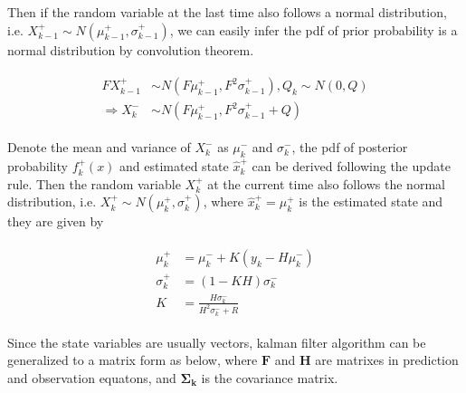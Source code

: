 \documentclass[conference]{IEEEtran}
\begin{document}
	Then if the random variable at the last time also follows a normal distribution, i.e. $X_{k-1}^{+}\sim N(\mu _{k-1}^{+},\sigma  _{k-1}^{+})$, we can easily infer the pdf of prior probability is a normal distribution by convolution theorem.
	
	\begin{equation}
	\begin{split}
	\begin{aligned}
	FX_{k-1}^{+}&\sim N(F\mu _{k-1}^{+},F^{2}\sigma  _{k-1}^{+}), Q_{k}\sim N(0,Q)\\
	\Rightarrow X_{k}^{-}&\sim N(F\mu _{k-1}^{+},F^{2}\sigma  _{k-1}^{+}+Q)
	\label{eq10}
	\end{aligned}
	\end{split}
	\end{equation}
	
	Denote the mean and variance of $X_{k}^{-}$ as $\mu_{k}^{-}$ and $\sigma_{k}^{-}$, the pdf of posterior probability $f_{k}^{+}(x)$ and estimated state $\hat{x}_{k}^{+}$ can be derived following the update rule. Then the random variable $X_{k}^{+}$ at the current time also follows the normal distribution, i.e. $X_{k}^{+} \sim N(\mu_{k}^{+}, \sigma_{k}^{+})$, where $\hat{x}_{k}^{+}=\mu_{k}^{+}$ is the estimated state and they are given by
	
	\begin{equation}
	\begin{split}
	\begin{aligned}
	\mu_{k}^{+}&=\mu_{k}^{-}+K(y_{k}-H\mu_{k}^{-}) \\
	\sigma_{k}^{+}&=(1-KH)\sigma_{k}^{-}\\
	K&=\frac{H\sigma_{k}^{-}}{H^{2}\sigma_{k}^{-}+R}
	\label{eq11}
	\end{aligned}
	\end{split}
	\end{equation}
	
	Since the state variables are usually vectors, kalman filter algorithm can be generalized to a matrix form as below, where $\boldsymbol{F}$ and $\boldsymbol{H}$ are matrixes in prediction and observation equatons, and $\boldsymbol{\Sigma _{k}}$ is the covariance matrix.
	
\end{document}
